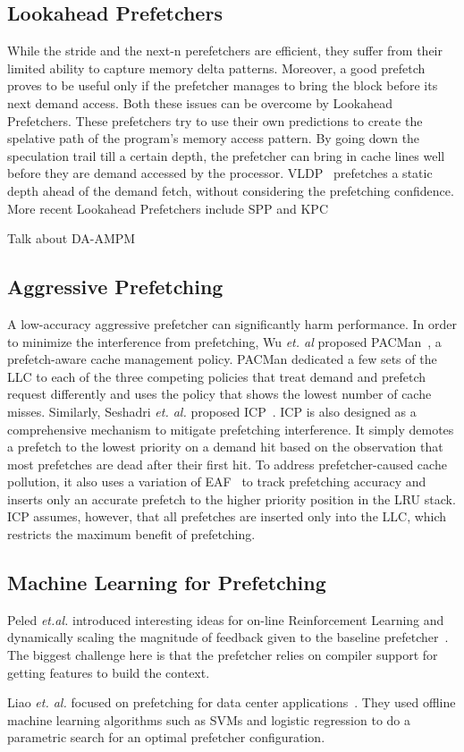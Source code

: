 \subsection{Lookahead Prefetchers}
While the stride and the next-n perefetchers are efficient, they suffer from their limited
ability to capture memory delta patterns. Moreover, a good prefetch proves to be useful only 
if the prefetcher manages to bring the block before its next demand access. Both these issues 
can be overcome by Lookahead Prefetchers. These prefetchers try to use their own predictions 
to create the spelative path of the program's memory access pattern. By going down the speculation
trail till a certain depth, the prefetcher can bring in cache lines well before they are demand 
accessed by the processor. VLDP~\cite{VLDP} prefetches a static depth ahead of the demand fetch, 
without considering the prefetching confidence. More recent Lookahead Prefetchers include SPP and
KPC~\cite{KPC}

Talk about DA-AMPM

\subsection{Aggressive Prefetching}


A low-accuracy aggressive prefetcher can significantly harm performance. 
In order to minimize the interference from prefetching, Wu \textit{et. al} proposed PACMan~\cite{pacman}, 
a prefetch-aware cache management policy. PACMan dedicated a few sets of the LLC to each of the three 
competing policies that treat demand and prefetch request differently and uses the policy that 
shows the lowest number of cache misses. Similarly, Seshadri  \textit{et. al.} proposed ICP~\cite{icp}. 
ICP is also designed as a comprehensive mechanism to mitigate prefetching interference. It simply 
demotes a prefetch to the lowest priority on a demand hit based on the observation that most 
prefetches are dead after their first hit. To address prefetcher-caused cache pollution, it also 
uses a variation of EAF~\cite{eaf} to track prefetching accuracy and inserts only an accurate 
prefetch to the higher priority position in the LRU stack. ICP assumes, however, that all 
prefetches are inserted only into the LLC, which restricts the maximum benefit of prefetching.

\subsection{Machine Learning for Prefetching}
Peled \textit{et.al.} introduced
interesting ideas for on-line Reinforcement Learning and dynamically scaling
the magnitude of feedback given to the baseline prefetcher~\cite{Semantics}.
The biggest challenge here is that the prefetcher relies on compiler support for
getting features to build the context.

Liao \textit{et. al.} focused on prefetching for data center
applications~\cite{Datacenter}. They used offline machine learning algorithms
such as SVMs and logistic regression to do a parametric search for an optimal
prefetcher configuration.
